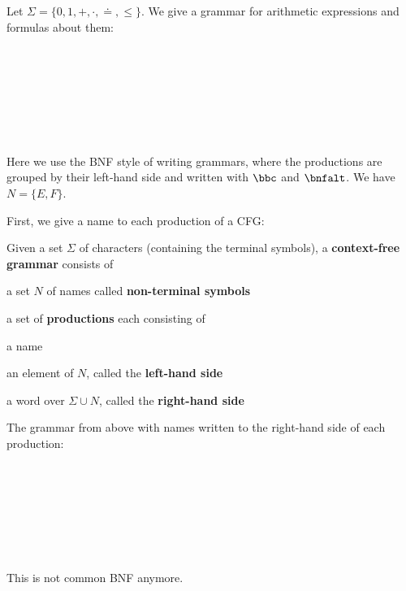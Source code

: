 \begin{example}
Let $\Sigma=\{0,1,+,\cdot,\doteq,\leq\}$.
We give a grammar for arithmetic expressions and formulas about them:
\begin{commgrammar}
\\
\\
\\
\\
\\
\\
\end{commgrammar}
Here we use the BNF style of writing grammars, where the productions are grouped by their left-hand side and written with $\bbc$ and $\bnfalt$.
We have $N=\{E,F\}$.
\end{example}

First, we give a name to each production of a CFG:

\begin{definition}
Given a set $\Sigma$ of characters (containing the terminal symbols), a \textbf{context-free grammar} consists of
\begin{compactitem}
\item a set $N$ of names called \textbf{non-terminal symbols}
\item a set of \textbf{productions} each consisting of
 \begin{compactitem}
  \item a name
  \item an element of $N$, called the \textbf{left-hand side}
  \item a word over $\Sigma\cup N$, called the \textbf{right-hand side}
 \end{compactitem}
\end{compactitem}
\end{definition}

\begin{example}
The grammar from above with names written to the right-hand side of each production:
\begin{commgrammar}
\\
\\
\\
\\
\\
\\
\end{commgrammar}
This is not common BNF anymore.
\end{example}

